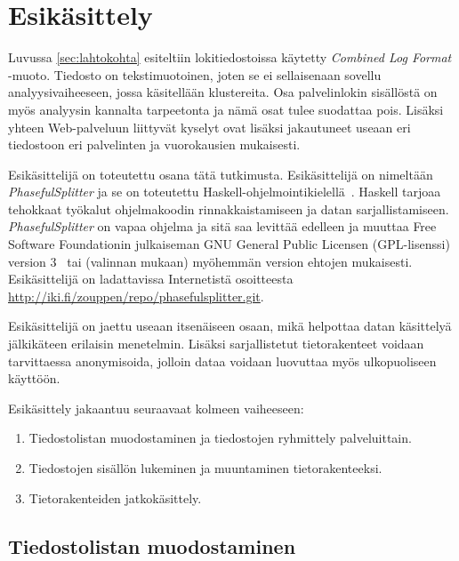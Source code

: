 \section{Esikäsittely}


Luvussa \ref{sec:lahtokohta} esiteltiin lokitiedostoissa käytetty
\textit{Combined Log Format} -muoto. Tiedosto on tekstimuotoinen,
joten se ei sellaisenaan sovellu analyysivaiheeseen, jossa käsitellään
klustereita. Osa palvelinlokin sisällöstä on myös analyysin kannalta
tarpeetonta ja nämä osat tulee suodattaa pois. Lisäksi yhteen
Web-palveluun liittyvät kyselyt ovat lisäksi jakautuneet useaan eri
tiedostoon eri palvelinten ja vuorokausien mukaisesti.

Esikäsittelijä on toteutettu osana tätä tutkimusta. Esikäsittelijä on
nimeltään \textit{PhasefulSplitter} ja se on toteutettu
Haskell-ohjelmointikielellä~\cite{haskell98}. Haskell tarjoaa
tehokkaat työkalut ohjelmakoodin rinnakkaistamiseen ja datan
sarjallistamiseen. \textit{PhasefulSplitter} on vapaa ohjelma ja sitä saa
levittää edelleen ja muuttaa Free Software Foundationin julkaiseman
GNU General Public Licensen (GPL-lisenssi) version 3~\cite{gplv3} tai (valinnan
mukaan) myöhemmän version ehtojen mukaisesti. Esikäsittelijä on
ladattavissa Internetistä osoitteesta \\
\url{http://iki.fi/zouppen/repo/phasefulsplitter.git}.

Esikäsittelijä on jaettu useaan itsenäiseen osaan, mikä helpottaa
datan käsittelyä jälkikäteen erilaisin menetelmin. Lisäksi
sarjallistetut tietorakenteet voidaan tarvittaessa anonymisoida,
jolloin dataa voidaan luovuttaa myös ulkopuoliseen käyttöön.

Esikäsittely jakaantuu seuraavaat kolmeen vaiheeseen:

\begin{enumerate}
\item Tiedostolistan muodostaminen ja tiedostojen ryhmittely palveluittain.
\item Tiedostojen sisällön lukeminen ja muuntaminen tietorakenteeksi.
\item Tietorakenteiden jatkokäsittely.
\end{enumerate}

\subsection{Tiedostolistan muodostaminen}

